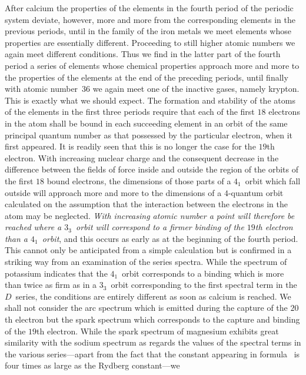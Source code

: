 After calcium the properties of the elements in the fourth period
of the periodic system deviate, however, more and more from the
corresponding elements in the previous periods, until in the family
of the iron metals we meet elements whose properties are essentially
different. Proceeding to still higher atomic numbers we again
meet different conditions. Thus we find in the latter part of the
fourth period a series of elements whose chemical properties approach
more and more to the properties of the elements at the end
of the preceding periods, until finally with atomic number~$36$ we
again meet one of the inactive gases, namely krypton. This is
exactly what we should expect. The formation and stability of the
atoms of the elements in the first three periods require that each
of the first $18$ electrons in the atom shall be bound in each succeeding
element in an orbit of the same principal quantum number
as that possessed by the particular electron, when it first appeared.
It is readily seen that this is no longer the case for the $19$th
electron. With increasing nuclear charge and the consequent
decrease in the difference between the fields of force inside and
outside the region of the orbits of the first $18$ bound electrons, the
dimensions of those parts of a $4_{1}$~orbit which fall outside will
approach more and more to the dimensions of a $4$-quantum orbit
calculated on the assumption that the interaction between the
electrons in the atom may be neglected. \emph{With increasing atomic
number a point will therefore be reached where a $3_{3}$~orbit will correspond
to a firmer binding of the $19$th electron than a $4_{1}$~orbit}, and
this occurs as early as at the beginning of the fourth period. This
cannot only be anticipated from a simple calculation but is confirmed
in a striking way from an examination of the series spectra. While
the spectrum of potassium indicates that the $4_{1}$~orbit corresponds
to a binding which is more than twice as firm as in a $3_{3}$~orbit
corresponding to the first spectral term in the $D$~series, the conditions
are entirely different as soon as calcium is reached. We
shall not consider the arc spectrum which is emitted during the
capture of the $20$th electron but the spark spectrum which corresponds
to the capture and binding of the $19$th electron. While the
spark spectrum of magnesium exhibits great similarity with the
sodium spectrum as regards the values of the spectral terms in the
various series---apart from the fact that the constant appearing in
formula~ is four times as large as the Rydberg constant---we
